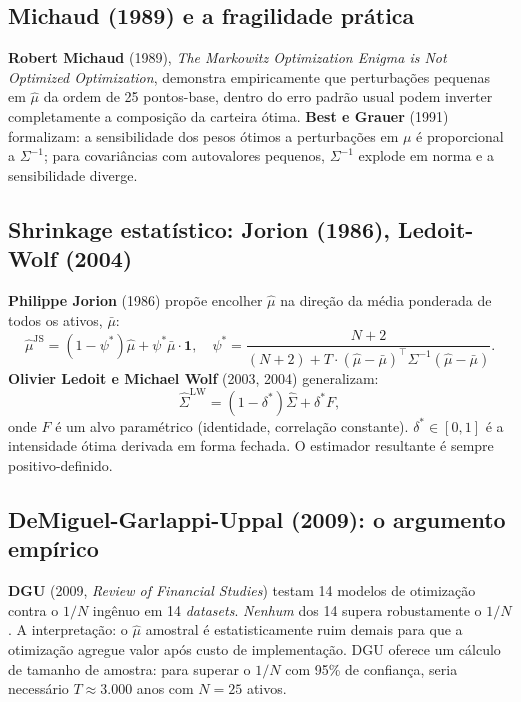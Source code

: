 \documentclass[12pt,a4paper,oneside]{article}
\begin{document}
\subsection{Michaud (1989) e a fragilidade prática}

\textbf{Robert Michaud} (1989), \textit{The Markowitz Optimization
Enigma is Not Optimized Optimization}, demonstra empiricamente que
perturbações pequenas em $\hat{\mu}$ \textemdash{} da ordem de 25
pontos-base, dentro do erro padrão usual \textemdash{} podem inverter
completamente a composição da carteira ótima. \textbf{Best e Grauer}
(1991) formalizam: a sensibilidade dos pesos ótimos a perturbações
em $\mu$ é proporcional a $\Sigma^{-1}$; para covariâncias com
autovalores pequenos, $\Sigma^{-1}$ explode em norma e a
sensibilidade diverge.

\subsection{Shrinkage estatístico: Jorion (1986), Ledoit-Wolf (2004)}

\textbf{Philippe Jorion} (1986) propõe encolher $\hat{\mu}$ na
direção da média ponderada de todos os ativos, $\bar{\mu}$:
\begin{equation}\label{eq:jorion}
\hat{\mu}^{\text{JS}} = (1 - \psi^*) \hat{\mu} + \psi^* \bar{\mu}
\cdot \mathbf{1},
\quad \psi^* = \frac{N+2}{(N+2) + T \cdot (\hat{\mu} - \bar{\mu})^\top \Sigma^{-1} (\hat{\mu} - \bar{\mu})}.
\end{equation}
\textbf{Olivier Ledoit e Michael Wolf} (2003, 2004) generalizam:
\begin{equation}\label{eq:ledoit-wolf}
\hat{\Sigma}^{\text{LW}} = (1 - \delta^*) \hat{\Sigma} + \delta^* F,
\end{equation}
onde $F$ é um alvo paramétrico (identidade, correlação constante).
$\delta^* \in [0, 1]$ é a intensidade ótima derivada em forma
fechada. O estimador resultante é sempre positivo-definido.

\subsection{DeMiguel-Garlappi-Uppal (2009): o argumento empírico}

\textbf{DGU} (2009, \textit{Review of Financial Studies}) testam 14
modelos de otimização contra o $1/N$ ingênuo em 14 \textit{datasets}.
\textit{Nenhum} dos 14 supera robustamente o $1/N$. A interpretação:
o $\hat{\mu}$ amostral é estatisticamente ruim demais para que a
otimização agregue valor após custo de implementação. DGU oferece um
cálculo de tamanho de amostra: para superar o $1/N$ com 95\% de
confiança, seria necessário $T \approx 3.000$ anos com $N = 25$
ativos.
\end{document}
